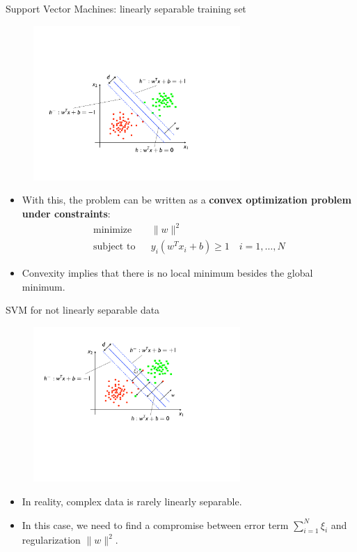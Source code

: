 \documentclass[xcolor=pdftex,dvipsnames,table]{beamer}
\begin{document}
\begin{frame}{Support Vector Machines: linearly separable training set}
	\begin{figure}[htb]
		\includegraphics[width=0.7\textwidth]{../graphics/SVM2.pdf}
	\end{figure}
	\begin{itemize}
		\item With this, the problem can be written as a {\bf convex optimization problem under constraints}:
		\begin{eqnarray*}
			\mbox{minimize} & & \|w\|^2 \\
			\mbox{subject to} & & y_i(w^Tx_i + b) \geq 1 \quad i = 1, \ldots, N
		\end{eqnarray*}
		\item Convexity implies that there is no local minimum besides the global minimum.
	\end{itemize}
\end{frame}


\begin{frame}{SVM for not linearly separable data}
	\begin{figure}[htb]
		\includegraphics[width=0.7\textwidth]{../graphics/SVM3.pdf}
	\end{figure}
	\begin{itemize}
		\item In reality, complex data is rarely linearly separable.
		\item In this case, we need to find a compromise between error term $\sum_{i=1}^{N}\xi_i$ and regularization $\|w\|^2$.
	\end{itemize}
\end{frame}
\end{document}
